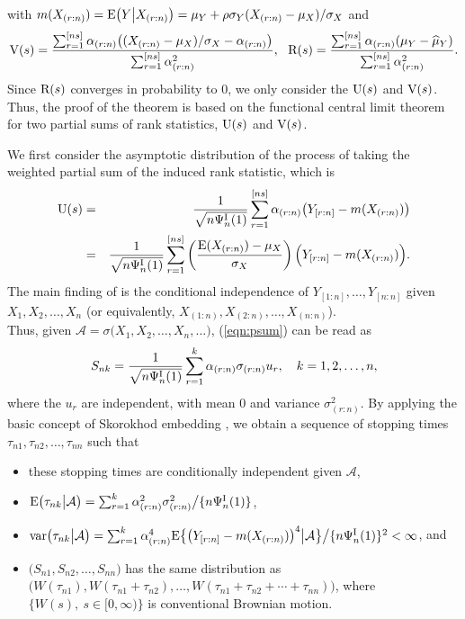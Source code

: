 \documentclass[12pt]{article}
\begin{document}
with
$m(X_{(r:n)})={\rm E} \big(Y \big| X_{(r:n)} \big)=\mu_Y + \rho \sigma_Y (X_{(r:n)}-\mu_X)/\sigma_X$ and 
\begin{equation} \nonumber 
 {\rm V}(s)=\frac{\sum_{r=1}^{[ns]} \alpha_{(r:n)} \big( (X_{(r:n)}-\mu_X)/\sigma_X - \alpha_{(r:n)} \big)}{\sum_{r=1}^{[ns]} \alpha_{(r:n)}^2},~~{\rm R}(s)=\frac{\sum_{r=1}^{[ns]}\alpha_{(r:n)}(\mu_Y-\widehat{\mu}_Y)}{\sum_{r=1}^{[ns]}\alpha_{(r:n)}^2}.
\end{equation}
Since ${\rm R}(s)$ converges in probability to 0, we only consider the ${\rm U}(s)$ and ${\rm V}(s)$.
Thus, the proof of the theorem is based on the functional
central limit theorem for two partial sums of rank statistics, ${\rm U}(s)$ and ${\rm V}(s)$. 


We first consider
the asymptotic distribution of the process of taking the weighted partial sum of the induced rank
statistic, which is
\begin{eqnarray}
{\rm U}(s) &=& \frac{1}{\sqrt{n \Psi_n^{\rm I}(1)}}\sum_{r=1}^{[ns]} \alpha_{(r:n)} \big( Y_{[r:n]} - m (X_{(r:n)}) \big)
\nonumber\\
&=&
\frac{1}{\sqrt{n \Psi_n^{\rm I}(1) } }\sum_{r=1}^{[ns]}
\left( \frac{  {\rm E}( X_{(r:n)} ) -\mu_X} { \sigma_X}   \right) \Big( Y_{[r:n]} - m (X_{(r:n)}) \Big). \label{eqn:psum}
\end{eqnarray}
The main finding of \citet{Bhattacharya:1974} is the
conditional independence of $Y_{[1:n]},\ldots,Y_{[n:n]}$ given
$X_1,X_2,\ldots,X_n$ (or equivalently, $X_{(1:n)}, X_{(2:n)}, \ldots, X_{(n:n)}$). \\Thus, given $\mathcal{A}=
\sigma\big( X_1,X_2,\ldots,X_n, \ldots \big)$, (\ref{eqn:psum}) can be read as
\begin{equation} \label{eqn:psum2}
S_{nk}=\frac{1}{\sqrt{n \Psi_n^{\rm I}(1)}}\sum_{r=1}^{k} \alpha_{(r:n)} \sigma_{(r:n)} u_r, \quad k=1,2,\ldots,n,
\end{equation}
 where the $u_r$ are independent, with mean $0$ and variance $\sigma_{(r:n)}^2$. By applying the basic concept of Skorokhod embedding 
\citep{Shorack:2009}, we
obtain a sequence of stopping times $\tau_{n1},\tau_{n2},\ldots,\tau_{nn}$ such that
\begin{itemize}
\item
these stopping times are conditionally
independent given $\mathcal{A}$,
\item ${\rm E} \big(\tau_{nk} \big| \mathcal{A} \big)= \sum_{r=1}^k \alpha_{(r:n)}^2 \sigma_{(r:n)}^2 \big/ \{ n \Psi_n^{\rm I}(1) \} $,
\item ${\rm var}  \big(\tau_{nk} \big| \mathcal{A} \big)= \sum_{r=1}^k \alpha_{(r:n)}^4
{\rm E} \big\{ \big( Y_{[r:n]} - m(X_{(r:n)}) \big)^4  \big| \mathcal{A} \big\} \big/ \{ n \Psi_n^{\rm I}(1) \} ^2  < \infty$, and
\item $\big(S_{n1}, S_{n2},\ldots,S_{nn} \big)$ has the same distribution as
$\big(W(\tau_{n1}), W(\tau_{n1}+\tau_{n2}),\ldots,W (\tau_{n1}+\tau_{n2}+\cdots+\tau_{nn}) \big)$, where $\big\{W(s), ~s \in [0, \infty) \big\}$ is
conventional Brownian motion.
\end{itemize}
\end{document}
